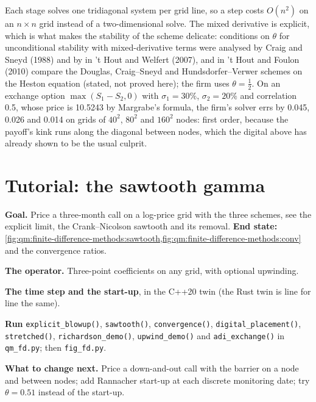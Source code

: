 Each stage solves one tridiagonal system per grid line, so a step costs $O(n^2)$ on an $n \times n$ grid instead of a two-dimensional solve. The mixed derivative is explicit, which is what makes the stability of
the scheme delicate: conditions on $\theta$ for unconditional stability with mixed-derivative terms were analysed by Craig and Sneyd (1988) and by in 't Hout and Welfert (2007), and in 't Hout and
Foulon (2010) compare the Douglas, Craig--Sneyd and Hundsdorfer--Verwer schemes on the Heston equation (stated, not proved here); the firm uses $\theta = \frac12$. On an exchange option $\max(S_1 - S_2, 0)$ with $\sigma_1 = 30\%$, $\sigma_2 = 20\%$ and correlation 0.5, whose price is 10.5243 by Margrabe's formula, the firm's solver
errs by 0.045, 0.026 and 0.014 on grids of $40^2$, $80^2$ and $160^2$ nodes: first order, because the payoff's kink runs along the diagonal between nodes, which the digital above has already shown to be
the usual culprit.

\section{Tutorial: the sawtooth gamma}\label{tut:qm:finite-difference-methods:sawtooth}

\begin{tutorial}
\textbf{Goal.} Price a three-month call on a log-price grid with the three schemes, see the explicit limit, the Crank--Nicolson sawtooth and its removal. \textbf{End state:}
\cref{fig:qm:finite-difference-methods:sawtooth,fig:qm:finite-difference-methods:conv} and the convergence ratios.
\begin{tutsteps}
\item \textbf{The operator.} Three-point coefficients on any grid, with optional upwinding.
\item \textbf{The time step and the start-up}, in the C++20 twin (the Rust twin is line for line the same).
\item \textbf{Run} \texttt{explicit\_blowup()}, \texttt{sawtooth()}, \texttt{convergence()}, \texttt{digital\_placement()}, \texttt{stretched()}, \texttt{richardson\_demo()},
\texttt{upwind\_demo()} and \texttt{adi\_exchange()} in \texttt{qm\_fd.py}; then \texttt{fig\_fd.py}.
\end{tutsteps}
\textbf{What to change next.} Price a down-and-out call with the barrier on a node and between nodes; add Rannacher start-up at each discrete monitoring date; try $\theta = 0.51$ instead of the start-up.
\end{tutorial}

